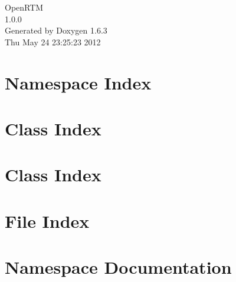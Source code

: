 \documentclass[a4paper]{book}
\begin{document}
\begin{titlepage}
\vspace*{7cm}
\begin{center}
{\Large OpenRTM \\[1ex]\large 1.0.0 }\\
\vspace*{1cm}
{\large Generated by Doxygen 1.6.3}\\
\vspace*{0.5cm}
{\small Thu May 24 23:25:23 2012}\\
\end{center}
\end{titlepage}
\clearemptydoublepage
{}
\tableofcontents
\clearemptydoublepage
{}
\chapter{Namespace Index}

\chapter{Class Index}

\chapter{Class Index}

\chapter{File Index}

\chapter{Namespace Documentation}




\end{document}
